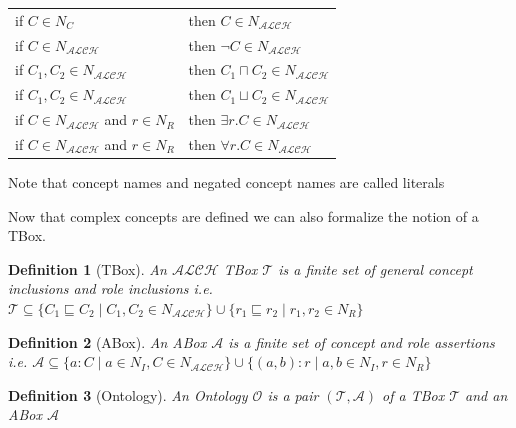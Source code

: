 \documentclass[titlepage]{article}
\newtheorem{definition}{Definition}
\begin{document}
    \begin{tabular}{l l}
      if $C \in N_C$ & then $C \in N_{\mathcal{ALCH}}$ \\
      if $C \in N_{\mathcal{ALCH}}$ & then $\neg C \in N_{\mathcal{ALCH}}$ \\
      if $C_1,C_2 \in N_{\mathcal{ALCH}}$ & then $C_1 \sqcap C_2 \in N_{\mathcal{ALCH}}$ \\
      if $C_1,C_2 \in N_{\mathcal{ALCH}}$ & then $C_1 \sqcup C_2 \in N_{\mathcal{ALCH}}$ \\
      if $C \in N_{\mathcal{ALCH}}$ and $r \in N_R$ & then $\exists r.C \in N_{\mathcal{ALCH}}$ \\
      if $C \in N_{\mathcal{ALCH}}$ and $r \in N_R$ & then $\forall r.C \in N_{\mathcal{ALCH}}$ \\
    \end{tabular} 
    Note that concept names and negated concept names are called literals
    
    

Now that complex concepts are defined we can also formalize the notion of a TBox.
\begin{definition}[TBox]
  An $\mathcal{ALCH}$ TBox $\mathcal{T}$ is a finite set of general concept inclusions and role inclusions
   i.e. $\mathcal{T} \subseteq \{C_1 \sqsubseteq C_2 \mid C_1, C_2 \in N_{\mathcal{ALCH}} \} \cup 
  \{r_1 \sqsubseteq r_2 \mid r_1, r_2 \in N_R\}$
\end{definition}

\begin{definition}[ABox]
  An ABox $\mathcal{A}$ is a finite set of concept and role assertions i.e.
  $\mathcal{A} \subseteq \{a:C \mid a \in N_I, C \in N_{\mathcal{ALCH}}\}
  \cup \{(a,b):r \mid a,b \in N_I, r \in N_R\}$
\end{definition}

\begin{definition}[Ontology]
  An Ontology $\mathcal{O}$ is a pair $(\mathcal{T}, \mathcal{A})$ of a TBox $\mathcal{T}$ and an ABox $\mathcal{A}$
\end{definition}
\end{document}
